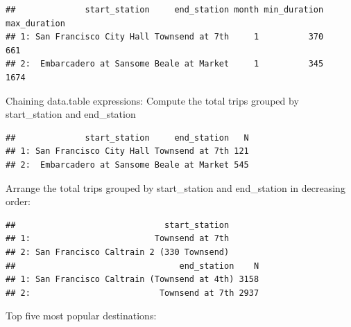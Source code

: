 \documentclass[]{book}
\newenvironment{Shaded}{\begin{snugshade}}{\end{snugshade}}
\newcommand{\DecValTok}[1]{\textcolor[rgb]{0.00,0.00,0.81}{#1}}
\newcommand{\KeywordTok}[1]{\textcolor[rgb]{0.13,0.29,0.53}{\textbf{#1}}}
\newcommand{\NormalTok}[1]{#1}
\newcommand{\OperatorTok}[1]{\textcolor[rgb]{0.81,0.36,0.00}{\textbf{#1}}}
\newcommand{\StringTok}[1]{\textcolor[rgb]{0.31,0.60,0.02}{#1}}
\begin{document}
\begin{verbatim}
##              start_station     end_station month min_duration max_duration
## 1: San Francisco City Hall Townsend at 7th     1          370          661
## 2:  Embarcadero at Sansome Beale at Market     1          345         1674
\end{verbatim}

Chaining data.table expressions:
Compute the total trips grouped by start\_station and end\_station

\begin{Shaded}
\end{Shaded}

\begin{verbatim}
##              start_station     end_station   N
## 1: San Francisco City Hall Townsend at 7th 121
## 2:  Embarcadero at Sansome Beale at Market 545
\end{verbatim}

Arrange the total trips grouped by start\_station and end\_station in decreasing order:

\begin{Shaded}
\end{Shaded}

\begin{verbatim}
##                              start_station
## 1:                         Townsend at 7th
## 2: San Francisco Caltrain 2 (330 Townsend)
##                                 end_station    N
## 1: San Francisco Caltrain (Townsend at 4th) 3158
## 2:                          Townsend at 7th 2937
\end{verbatim}

Top five most popular destinations:
\end{document}
